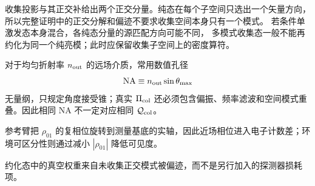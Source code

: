 \begin{remark}[亮模约化的纯态条件]
收集投影与其正交补给出两个正交分量。纯态在每个子空间只选出一个矢量方向，
所以完整证明中的正交分解和偏迹不要求收集空间本身只有一个模式。
若条件单激发态本身混合，各纯态分量的源匹配方向可能不同，
多模式收集态一般不能再约化为同一个纯亮模；此时应保留收集子空间上的密度算符。
\end{remark}

对于均匀折射率 $n_{\rm out}$ 的远场介质，常用数值孔径
\begin{equation*}
{\rm NA}\equiv n_{\rm out}\sin\theta_{\max}
\end{equation*}
无量纲，只规定角度接受锥；真实 $\Pi_{\rm col}$ 还必须包含偏振、频率滤波和空间模式重叠。因此相同 NA 不一定对应相同 $\mathcal Q_{\rm col}$。

参考臂把 $\rho_{01}$ 的复相位旋转到测量基底的实轴，因此近场相位进入电子计数差；环境可区分性则通过减小 $|\rho_{01}|$ 降低可见度。

约化态中的真空权重来自未收集正交模式被偏迹，而不是另行加入的探测器损耗项。






